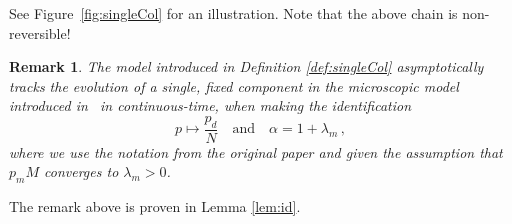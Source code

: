 \documentclass{article}
\numberwithin{equation}{section}
\renewcommand{\l}{\lambda}
\newcommand{\1}{\mathbbm{1}}
\newtheorem*{remark}{Remark}
\begin{document}
See Figure~\ref{fig:singleCol} for an illustration. Note that the above chain is non-reversible!
\begin{remark}\label{rem:equiv}
    The model introduced in Definition \ref{def:singleCol} asymptotically tracks the evolution of a single, fixed component in the microscopic model introduced in~\cite{kuehn2025mathematicalmodelsselfadaptiveresponse} in continuous-time, when making the identification
    \begin{equation}
        p\mapsto \frac{p_d}{N}\quad\text{and}\quad \alpha=1+\l_m\, ,
    \end{equation}
    where we use the notation from the original paper and given the assumption that $p_m M$ converges to $\lambda_m>0$.
\end{remark}
The remark above is proven in Lemma \ref{lem:id}.
\end{document}

